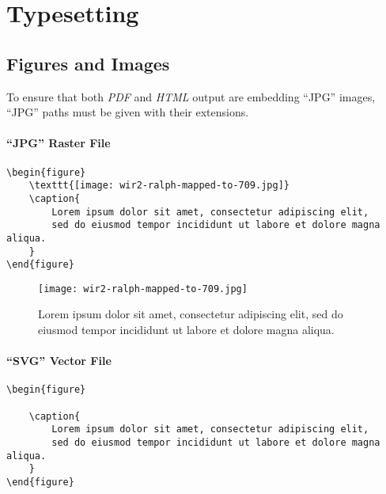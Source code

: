 \chapter*{Typesetting}

\section{Figures and Images}

To ensure that both \textit{PDF} and \textit{HTML} output are embedding
``JPG'' images, ``JPG'' paths must be given with their extensions.

\subsubsection{``JPG'' Raster File}

\begin{lstlisting}[caption=Embedding a ``JPG'' raster file.]
\begin{figure}
    \texttt{[image: wir2-ralph-mapped-to-709.jpg]}
    \caption{
        Lorem ipsum dolor sit amet, consectetur adipiscing elit,
        sed do eiusmod tempor incididunt ut labore et dolore magna aliqua.
    }
\end{figure}
\end{lstlisting}

\begin{figure}
    \texttt{[image: wir2-ralph-mapped-to-709.jpg]}
    \caption{
        Lorem ipsum dolor sit amet, consectetur adipiscing elit,
        sed do eiusmod tempor incididunt ut labore et dolore magna aliqua.
    }
\end{figure}

\subsubsection{``SVG'' Vector File}

\begin{lstlisting}[caption=Embedding a ``SVG'' vector file.]
\begin{figure}
    
    \caption{
        Lorem ipsum dolor sit amet, consectetur adipiscing elit,
        sed do eiusmod tempor incididunt ut labore et dolore magna aliqua.
    }
\end{figure}
\end{lstlisting}

